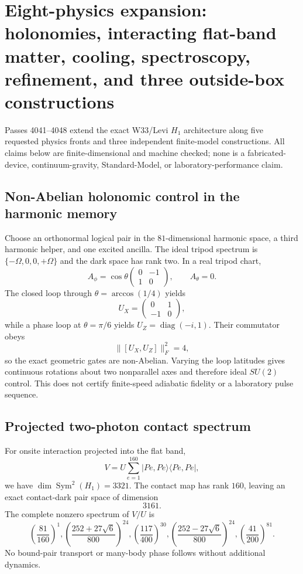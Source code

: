 \section{Eight-physics expansion: holonomies, interacting flat-band matter, cooling, spectroscopy, refinement, and three outside-box constructions}
\label{sec:bt4041-4048-eight-physics}

Passes 4041--4048 extend the exact W33/Levi $H_1$ architecture along five requested physics fronts and three independent finite-model constructions.  All claims below are finite-dimensional and machine checked; none is a fabricated-device, continuum-gravity, Standard-Model, or laboratory-performance claim.

\subsection{Non-Abelian holonomic control in the harmonic memory}
Choose an orthonormal logical pair in the $81$-dimensional harmonic space, a third harmonic helper, and one excited ancilla.  The ideal tripod spectrum is $\{-\Omega,0,0,+\Omega\}$ and the dark space has rank two.  In a real tripod chart,
\[
 A_\phi=\cos\theta\begin{pmatrix}0&-1\\1&0\end{pmatrix},\qquad A_\theta=0.
\]
The closed loop through $\theta=\arccos(1/4)$ yields
\[
 U_X=\begin{pmatrix}0&1\\-1&0\end{pmatrix},
\]
while a phase loop at $\theta=\pi/6$ yields $U_Z=\operatorname{diag}(-i,1)$.  Their commutator obeys
\[
 \|[U_X,U_Z]\|_F^2=4,
\]
so the exact geometric gates are non-Abelian.  Varying the loop latitudes gives continuous rotations about two nonparallel axes and therefore ideal $SU(2)$ control.  This does not certify finite-speed adiabatic fidelity or a laboratory pulse sequence.

\subsection{Projected two-photon contact spectrum}
For onsite interaction projected into the flat band,
\[
 V=U\sum_{e=1}^{160}|Pe,Pe\rangle\langle Pe,Pe|,
\]
we have $\dim\operatorname{Sym}^2(H_1)=3321$.  The contact map has rank $160$, leaving an exact contact-dark pair space of dimension
\[
 \boxed{3161}.
\]
The complete nonzero spectrum of $V/U$ is
\[
 \left(\frac{81}{160}\right)^1,
 \left(\frac{252+27\sqrt6}{800}\right)^{24},
 \left(\frac{117}{400}\right)^{30},
 \left(\frac{252-27\sqrt6}{800}\right)^{24},
 \left(\frac{41}{200}\right)^{81}.
\]
No bound-pair transport or many-body phase follows without additional dynamics.

